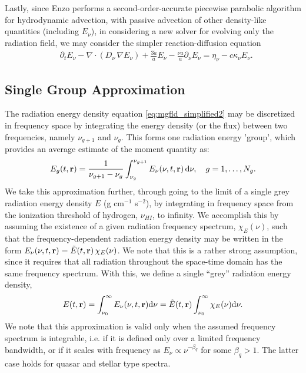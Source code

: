 \documentclass[10pt]{article}
\renewcommand{\(}{\left(}
\renewcommand{\)}{\right)}
\newcommand{\rvec}{{\bf r}}
\newcommand{\adot}{\dot{a}}
\newcommand{\Enu}{E_{\nu}}
\begin{document}
Lastly, since Enzo performs a second-order-accurate piecewise
parabolic algorithm for hydrodynamic advection, with passive advection
of other density-like quantities (including $\Enu$), in considering a
new solver for evolving only the radiation field, we may consider the
simpler reaction-diffusion equation
\begin{align}
  \label{eq:mgfld_simplified2}
  &\partial_{t} \Enu - \nabla\cdot(D_{\nu}\,\nabla\Enu) 
      + \frac{3 \adot}{a} \Enu - \frac{\nu \adot}{a}\partial_{\nu}\Enu
    = \eta_{\nu} - c \kappa_{\nu} \Enu.
\end{align}




\subsection{Single Group Approximation}
\label{subsec:single_group}

The radiation energy density equation \eqref{eq:mgfld_simplified2} may
be discretized in frequency space by integrating the energy density
(or the flux) between two frequencies, namely $\nu_{g+1}$ and
$\nu_{g}$.  This forms one radiation energy 'group', which provides an
average estimate of the moment quantity as:
\[
   E_{g}(t,\rvec) = \frac{1}{\nu_{g+1}-\nu_{g}} \int_{\nu_{g}}^{\nu_{g+1}}
   \Enu(\nu,t,\rvec)\,\mathrm d\nu, \quad g=1,\ldots,N_g.
\]
We take this approximation further, through going to the limit of a
single grey radiation energy density $E$ (g cm$^{-1}$ s$^{-2}$), by
integrating in frequency space from the ionization threshold of
hydrogen, $\nu_{HI}$, to infinity.  We accomplish this by assuming
the existence of a given radiation frequency spectrum, $\chi_E(\nu)$,
such that the frequency-dependent radiation energy density may be
written in the form $\Enu(\nu,t,\rvec)=\tilde{E}(t,\rvec)\,\chi_E(\nu)$.  
We note that this is a rather strong assumption, since it requires
that all radiation throughout the space-time domain has the same
frequency spectrum.  With this, we define a single ``grey'' radiation
energy density, 
\begin{equation}
\label{eq:grey_definition}
  E(t,\rvec) = \int_{\nu_0}^{\infty} \Enu(\nu,t,\rvec) \mathrm d\nu =
  \tilde{E}(t,\rvec) \int_{\nu_0}^{\infty} \chi_{E}(\nu)\mathrm d\nu.
\end{equation}
We note that this approximation is valid only when the assumed
frequency spectrum is integrable, i.e. if it is defined only over a
limited frequency bandwidth, or if it scales with frequency as
$E_{\nu} \propto \nu^{-\beta_{q}}$ for some $\beta_{q} > 1$.  The
latter case holds for quasar and stellar type spectra. 
\end{document}
